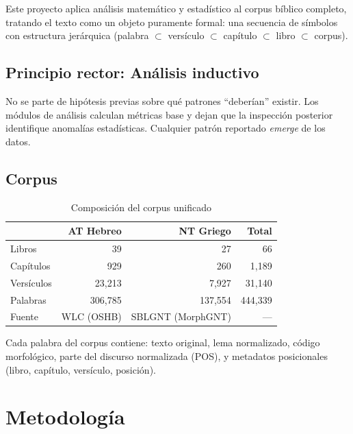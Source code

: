 \documentclass[12pt,a4paper]{article}
\newcommand{\ot}{\textcolor{otcolor}{\textbf{AT}}}
\newcommand{\nt}{\textcolor{ntcolor}{\textbf{NT}}}
\begin{document}
Este proyecto aplica an\'alisis matem\'atico y estad\'istico al corpus b\'iblico completo,
tratando el texto como un objeto puramente formal: una secuencia de s\'imbolos con
estructura jer\'arquica (palabra $\subset$ vers\'iculo $\subset$ cap\'itulo $\subset$ libro $\subset$ corpus).

\subsection{Principio rector: An\'alisis inductivo}

No se parte de hip\'otesis previas sobre qu\'e patrones ``deber\'ian'' existir.
Los m\'odulos de an\'alisis calculan m\'etricas base y dejan que la inspecci\'on posterior
identifique anomal\'ias estad\'isticas. Cualquier patr\'on reportado \emph{emerge} de los datos.

\subsection{Corpus}

\begin{table}[H]
\centering
\caption{Composici\'on del corpus unificado}
\label{tab:corpus}
\begin{tabular}{lrrr}
\toprule
& \textbf{\ot{} Hebreo} & \textbf{\nt{} Griego} & \textbf{Total} \\
\midrule
Libros       & 39      & 27      & 66 \\
Cap\'itulos  & 929     & 260     & 1,189 \\
Vers\'iculos & 23,213  & 7,927   & 31,140 \\
Palabras     & 306,785 & 137,554 & 444,339 \\
\midrule
Fuente       & WLC (OSHB) & SBLGNT (MorphGNT) & --- \\
\bottomrule
\end{tabular}
\end{table}

Cada palabra del corpus contiene: texto original, lema normalizado, c\'odigo morfol\'ogico,
parte del discurso normalizada (POS), y metadatos posicionales (libro, cap\'itulo, vers\'iculo, posici\'on).


\section{Metodolog\'ia}
\end{document}

